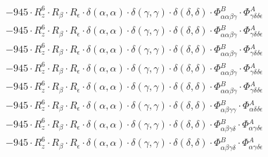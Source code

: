\documentclass{article}
\begin{document}
\begin{subequations}
\begin{gather}
\begin{array}{c}
 \\[0.2em] 		 - 945 \cdot R_{z}^{6} \cdot R_{\beta{}} \cdot R_{\epsilon{}} \cdot \delta{}\left(\alpha{}, \alpha{}\right) \cdot \delta{}\left(\gamma{}, \gamma{}\right) \cdot \delta{}\left(\delta{}, \delta{}\right) \cdot \Phi{}^{B}_{\alpha{}\alpha{}\beta{}\gamma{}} \cdot \Phi{}^{A}_{\gamma{}\delta{}\delta{}\epsilon{}} 
 \\[0.2em] 		 - 945 \cdot R_{z}^{6} \cdot R_{\beta{}} \cdot R_{\epsilon{}} \cdot \delta{}\left(\alpha{}, \alpha{}\right) \cdot \delta{}\left(\gamma{}, \gamma{}\right) \cdot \delta{}\left(\delta{}, \delta{}\right) \cdot \Phi{}^{B}_{\alpha{}\alpha{}\beta{}\gamma{}} \cdot \Phi{}^{A}_{\gamma{}\delta{}\delta{}\epsilon{}} 
 \\[0.2em] 		 - 945 \cdot R_{z}^{6} \cdot R_{\beta{}} \cdot R_{\epsilon{}} \cdot \delta{}\left(\alpha{}, \alpha{}\right) \cdot \delta{}\left(\gamma{}, \gamma{}\right) \cdot \delta{}\left(\delta{}, \delta{}\right) \cdot \Phi{}^{B}_{\alpha{}\alpha{}\beta{}\gamma{}} \cdot \Phi{}^{A}_{\gamma{}\delta{}\delta{}\epsilon{}} 
 \\[0.2em] 		 - 945 \cdot R_{z}^{6} \cdot R_{\beta{}} \cdot R_{\epsilon{}} \cdot \delta{}\left(\alpha{}, \alpha{}\right) \cdot \delta{}\left(\gamma{}, \gamma{}\right) \cdot \delta{}\left(\delta{}, \delta{}\right) \cdot \Phi{}^{B}_{\alpha{}\alpha{}\beta{}\gamma{}} \cdot \Phi{}^{A}_{\gamma{}\delta{}\delta{}\epsilon{}} 
 \\[0.2em] 		 - 945 \cdot R_{z}^{6} \cdot R_{\beta{}} \cdot R_{\epsilon{}} \cdot \delta{}\left(\alpha{}, \alpha{}\right) \cdot \delta{}\left(\gamma{}, \gamma{}\right) \cdot \delta{}\left(\delta{}, \delta{}\right) \cdot \Phi{}^{B}_{\alpha{}\alpha{}\beta{}\gamma{}} \cdot \Phi{}^{A}_{\gamma{}\delta{}\delta{}\epsilon{}} 
 \\[0.2em] 		 - 945 \cdot R_{z}^{6} \cdot R_{\beta{}} \cdot R_{\epsilon{}} \cdot \delta{}\left(\alpha{}, \alpha{}\right) \cdot \delta{}\left(\gamma{}, \gamma{}\right) \cdot \delta{}\left(\delta{}, \delta{}\right) \cdot \Phi{}^{B}_{\alpha{}\beta{}\gamma{}\gamma{}} \cdot \Phi{}^{A}_{\alpha{}\delta{}\delta{}\epsilon{}} 
 \\[0.2em] 		 - 945 \cdot R_{z}^{6} \cdot R_{\beta{}} \cdot R_{\epsilon{}} \cdot \delta{}\left(\alpha{}, \alpha{}\right) \cdot \delta{}\left(\gamma{}, \gamma{}\right) \cdot \delta{}\left(\delta{}, \delta{}\right) \cdot \Phi{}^{B}_{\alpha{}\beta{}\gamma{}\delta{}} \cdot \Phi{}^{A}_{\alpha{}\gamma{}\delta{}\epsilon{}} 
 \\[0.2em] 		 - 945 \cdot R_{z}^{6} \cdot R_{\beta{}} \cdot R_{\epsilon{}} \cdot \delta{}\left(\alpha{}, \alpha{}\right) \cdot \delta{}\left(\gamma{}, \gamma{}\right) \cdot \delta{}\left(\delta{}, \delta{}\right) \cdot \Phi{}^{B}_{\alpha{}\beta{}\gamma{}\delta{}} \cdot \Phi{}^{A}_{\alpha{}\gamma{}\delta{}\epsilon{}} 

\end{array}
\end{gather}
\end{subequations}
\end{document}
